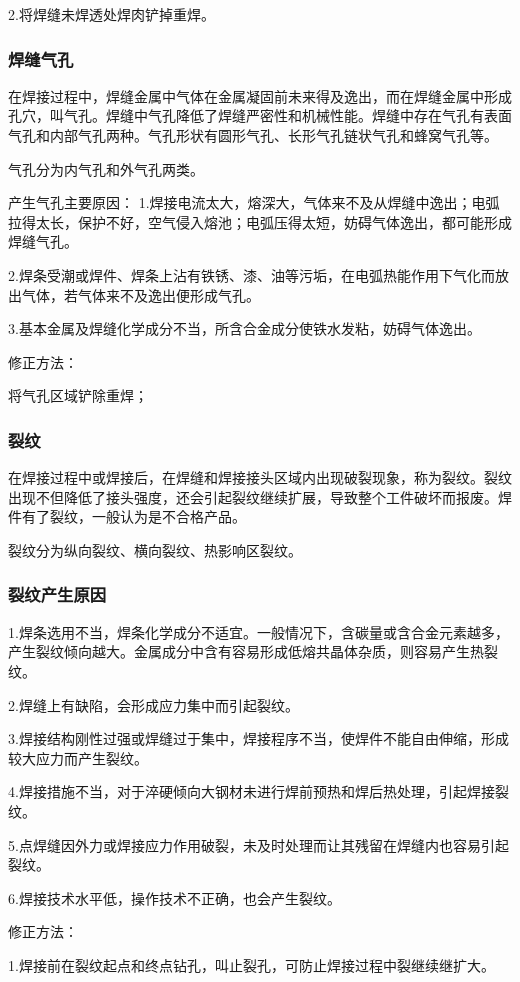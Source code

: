 \documentclass{ctexbook}
\begin{document}
2.将焊缝未焊透处焊肉铲掉重焊。
\subsubsection{焊缝气孔}
在焊接过程中，焊缝金属中气体在金属凝固前未来得及逸出，而在焊缝金属中形成孔穴，叫气孔。焊缝中气孔降低了焊缝严密性和机械性能。焊缝中存在气孔有表面气孔和内部气孔两种。气孔形状有圆形气孔、长形气孔链状气孔和蜂窝气孔等。

气孔分为内气孔和外气孔两类。

产生气孔主要原因：
1.焊接电流太大，熔深大，气体来不及从焊缝中逸出；电弧拉得太长，保护不好，空气侵入熔池；电弧压得太短，妨碍气体逸出，都可能形成焊缝气孔。

2.焊条受潮或焊件、焊条上沾有铁锈、漆、油等污垢，在电弧热能作用下气化而放出气体，若气体来不及逸出便形成气孔。

3.基本金属及焊缝化学成分不当，所含合金成分使铁水发粘，妨碍气体逸出。

修正方法：

将气孔区域铲除重焊；
\subsubsection{裂纹}
在焊接过程中或焊接后，在焊缝和焊接接头区域内出现破裂现象，称为裂纹。裂纹出现不但降低了接头强度，还会引起裂纹继续扩展，导致整个工件破坏而报废。焊件有了裂纹，一般认为是不合格产品。

裂纹分为纵向裂纹、横向裂纹、热影响区裂纹。
\subsubsection{裂纹产生原因}
1.焊条选用不当，焊条化学成分不适宜。一般情况下，含碳量或含合金元素越多，产生裂纹倾向越大。金属成分中含有容易形成低熔共晶体杂质，则容易产生热裂纹。

2.焊缝上有缺陷，会形成应力集中而引起裂纹。

3.焊接结构刚性过强或焊缝过于集中，焊接程序不当，使焊件不能自由伸缩，形成较大应力而产生裂纹。

4.焊接措施不当，对于淬硬倾向大钢材未进行焊前预热和焊后热处理，引起焊接裂纹。

5.点焊缝因外力或焊接应力作用破裂，未及时处理而让其残留在焊缝内也容易引起裂纹。

6.焊接技术水平低，操作技术不正确，也会产生裂纹。

修正方法：

1.焊接前在裂纹起点和终点钻孔，叫止裂孔，可防止焊接过程中裂继续继扩大。
\end{document}
